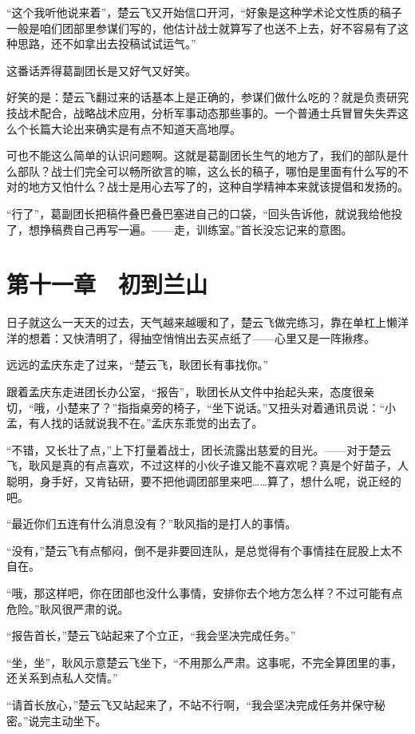 “这个我听他说来着”，楚云飞又开始信口开河，“好象是这种学术论文性质的稿子一般是咱们团部里参谋们写的，他估计战士就算写了也送不上去，好不容易有了这种思路，还不如拿出去投稿试试运气。”

这番话弄得葛副团长是又好气又好笑。

好笑的是：楚云飞翻过来的话基本上是正确的，参谋们做什么吃的？就是负责研究技战术配合，战略战术应用，分析军事动态那些事的。一个普通士兵冒冒失失弄这么个长篇大论出来确实是有点不知道天高地厚。

可也不能这么简单的认识问题啊。这就是葛副团长生气的地方了，我们的部队是什么部队？战士们完全可以畅所欲言的嘛，这么长的稿子，哪怕是里面有什么写的不对的地方又怕什么？战士是用心去写了的，这种自学精神本来就该提倡和发扬的。

“行了”，葛副团长把稿件叠巴叠巴塞进自己的口袋，“回头告诉他，就说我给他投了，想挣稿费自己再写一遍。——走，训练室。”首长没忘记来的意图。

\section{第十一章　初到兰山}

日子就这么一天天的过去，天气越来越暖和了，楚云飞做完练习，靠在单杠上懒洋洋的想着：又快清明了，得抽空悄悄出去买点纸了——心里又是一阵揪疼。

远远的孟庆东走了过来，“楚云飞，耿团长有事找你。”

跟着孟庆东走进团长办公室，“报告”，耿团长从文件中抬起头来，态度很亲切，“哦，小楚来了？”指指桌旁的椅子，“坐下说话。”又扭头对着通讯员说：“小孟，有人找的话就说我不在。”孟庆东乖觉的出去了。

“不错，又长壮了点，”上下打量着战士，团长流露出慈爱的目光。——对于楚云飞，耿风是真的有点喜欢，不过这样的小伙子谁又能不喜欢呢？真是个好苗子，人聪明，身手好，又肯钻研，要不把他调团部里来吧……算了，想什么呢，说正经的吧。

“最近你们五连有什么消息没有？”耿风指的是打人的事情。

“没有，”楚云飞有点郁闷，倒不是非要回连队，是总觉得有个事情挂在屁股上太不自在。

“哦，那这样吧，你在团部也没什么事情，安排你去个地方怎么样？不过可能有点危险。”耿风很严肃的说。

“报告首长，”楚云飞站起来了个立正，“我会坚决完成任务。”

“坐，坐”，耿风示意楚云飞坐下，“不用那么严肃。这事呢，不完全算团里的事，还关系到点私人交情。”

“请首长放心，”楚云飞又站起来了，不站不行啊，“我会坚决完成任务并保守秘密。”说完主动坐下。

